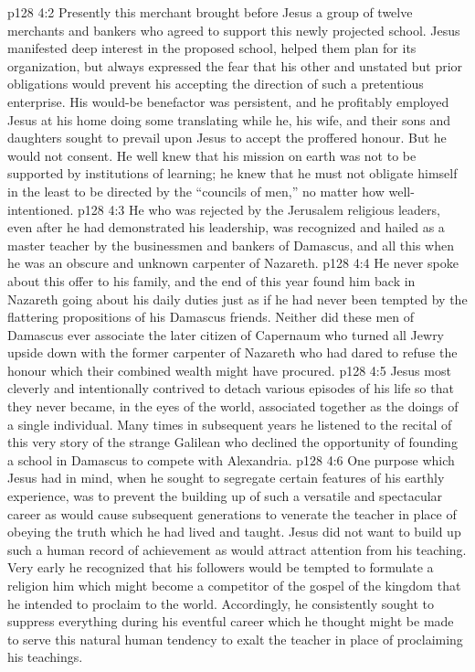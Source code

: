 \vs p128 4:2 Presently this merchant brought before Jesus a group of twelve merchants and bankers who agreed to support this newly projected school. Jesus manifested deep interest in the proposed school, helped them plan for its organization, but always expressed the fear that his other and unstated but prior obligations would prevent his accepting the direction of such a pretentious enterprise. His would\hyp{}be benefactor was persistent, and he profitably employed Jesus at his home doing some translating while he, his wife, and their sons and daughters sought to prevail upon Jesus to accept the proffered honour. But he would not consent. He well knew that his mission on earth was not to be supported by institutions of learning; he knew that he must not obligate himself in the least to be directed by the “councils of men,” no matter how well\hyp{}intentioned.
\vs p128 4:3 He who was rejected by the Jerusalem religious leaders, even after he had demonstrated his leadership, was recognized and hailed as a master teacher by the businessmen and bankers of Damascus, and all this when he was an obscure and unknown carpenter of Nazareth.
\vs p128 4:4 He never spoke about this offer to his family, and the end of this year found him back in Nazareth going about his daily duties just as if he had never been tempted by the flattering propositions of his Damascus friends. Neither did these men of Damascus ever associate the later citizen of Capernaum who turned all Jewry upside down with the former carpenter of Nazareth who had dared to refuse the honour which their combined wealth might have procured.
\vs p128 4:5 \pc Jesus most cleverly and intentionally contrived to detach various episodes of his life so that they never became, in the eyes of the world, associated together as the doings of a single individual. Many times in subsequent years he listened to the recital of this very story of the strange Galilean who declined the opportunity of founding a school in Damascus to compete with Alexandria.
\vs p128 4:6 One purpose which Jesus had in mind, when he sought to segregate certain features of his earthly experience, was to prevent the building up of such a versatile and spectacular career as would cause subsequent generations to venerate the teacher in place of obeying the truth which he had lived and taught. Jesus did not want to build up such a human record of achievement as would attract attention from his teaching. Very early he recognized that his followers would be tempted to formulate a religion  him which might become a competitor of the gospel of the kingdom that he intended to proclaim to the world. Accordingly, he consistently sought to suppress everything during his eventful career which he thought might be made to serve this natural human tendency to exalt the teacher in place of proclaiming his teachings.
